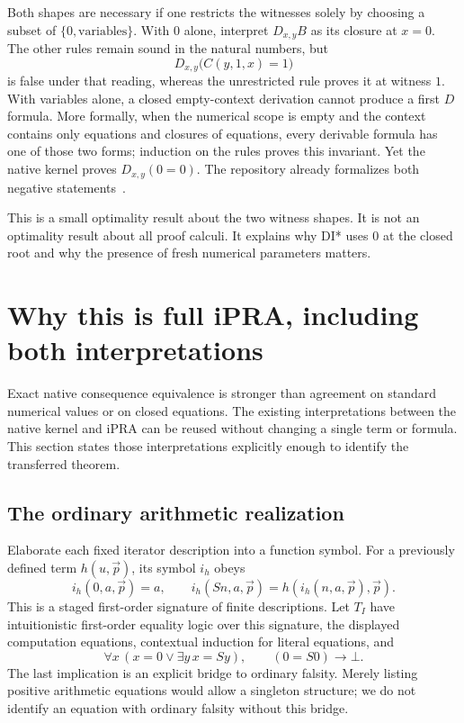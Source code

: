 \documentclass[11pt]{article}
\theoremstyle{definition}
\theoremstyle{remark}
\begin{document}
Both shapes are necessary if one restricts the witnesses solely by
choosing a subset of $\{0,\text{variables}\}$. With $0$ alone, interpret
$D_{x,y}B$ as its closure at $x=0$. The other rules remain sound in
the natural numbers, but
\[
 D_{x,y}\bigl(C(y,1,x)=1\bigr)
\]
is false under that reading, whereas the unrestricted rule proves it
at witness $1$. With variables alone, a closed empty-context derivation
cannot produce a first $D$ formula. More formally, when the numerical
scope is empty and the context contains only equations and closures of
equations, every derivable formula has one of those two forms; induction
on the rules proves this invariant. Yet the native kernel proves
$D_{x,y}(0=0)$. The repository already formalizes both negative
statements~\cite{witnessshape}.

This is a small optimality result about the two witness shapes. It is
not an optimality result about all proof calculi. It explains why DI*
uses $0$ at the closed root and why the presence of fresh numerical
parameters matters.

\section{Why this is full iPRA, including both interpretations}
\label{sec:ipra-bridge}

Exact native consequence equivalence is stronger than agreement on
standard numerical values or on closed equations. The existing
interpretations between the native kernel and iPRA can be reused without
changing a single term or formula. This section states those
interpretations explicitly enough to identify the transferred theorem.

\subsection{The ordinary arithmetic realization}

Elaborate each fixed iterator description into a function symbol. For a
previously defined term $h(u,\vec p)$, its symbol $i_h$ obeys
\[
 i_h(0,a,\vec p)=a,\qquad
 i_h(Sn,a,\vec p)=h(i_h(n,a,\vec p),\vec p).
\]
This is a staged first-order signature of finite descriptions. Let
$T_I$ have intuitionistic first-order equality logic over this signature,
the displayed computation equations, contextual induction for literal
equations, and
\[
 \forall x\,(x=0\lor\exists y\,x=Sy),\qquad
 (0=S0)\to\bot.
\]
The last implication is an explicit bridge to ordinary falsity. Merely
listing positive arithmetic equations would allow a singleton structure;
we do not identify an equation with ordinary falsity without this bridge.
\end{document}
